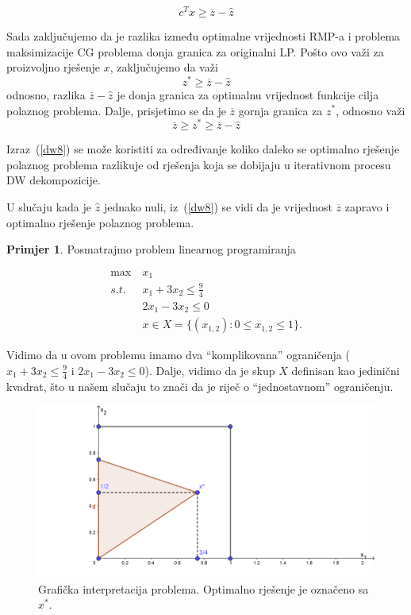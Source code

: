 \documentclass[a4paper, utf8, 11pt, colorlinks]{book}
\theoremstyle{definition}
\newtheorem{primjer}{Primjer}[chapter]
\begin{document}
 $$ c^Tx\geqslant \overline{z}-\hat{z}$$
 
 Sada zaključujemo da je razlika između optimalne vrijednosti RMP-a i problema maksimizacije CG  problema donja granica za originalni LP. Pošto ovo važi za proizvoljno rješenje $x$, zaključujemo da važi 
 $$z^*\geqslant \overline{z}-\hat{z}$$
 odnosno, razlika $\overline{z}-\hat{z}$ je donja granica za optimalnu vrijednost funkcije cilja polaznog problema. Dalje, prisjetimo se da je $\overline{z}$ gornja granica za $z^*$, odnosno važi 
\begin{equation}\label{dw8}
	  \overline{z}\geqslant z^*\geqslant \overline{z}-\hat{z}
\end{equation}
 
 Izraz~(\ref{dw8}) se može koristiti za određivanje koliko daleko se optimalno rješenje polaznog problema razlikuje od rješenja koja se dobijaju u iterativnom procesu DW dekompozicije.
 
 U slučaju kada je $\hat{z}$ jednako nuli, iz~(\ref{dw8}) se vidi da je vrijednost $\overline{z}$ zapravo i optimalno rješenje polaznog problema.
 
\begin{primjer}%
 
 Posmatrajmo problem linearnog programiranja
 \end{primjer}
   \begin{equation}
 	\begin{aligned}\label{primjer:dw1}
 		\max\  &x_1\\
 		s.t.\  &x_1+3x_2\leqslant \frac94\\
 		 &2x_1-3x_2\leqslant 0\\
 		&x \in X=\{(x_{1,2}):0\leqslant x_{1, 2}  \leqslant 1\}.
 	\end{aligned}
 \end{equation}
 
 Vidimo da u ovom problemu imamo dva ``komplikovana'' ograničenja ($x_1+3x_2\leqslant \frac94$ i
 $2x_1-3x_2\leqslant 0$). Dalje, vidimo da je skup $X$ definisan kao jedinični kvadrat, što u našem slučaju to znači da je riječ o ``jednostavnom'' ograničenju. 
 
 \begin{figure}\label{fig:dw1}
 	
 	\includegraphics[scale=4]{dw2.png}
 	\caption{Grafička interpretacija problema. Optimalno rješenje je označeno sa $x^*$. }
 	\label{fig:dw1}
 \end{figure}
 
\end{document}
